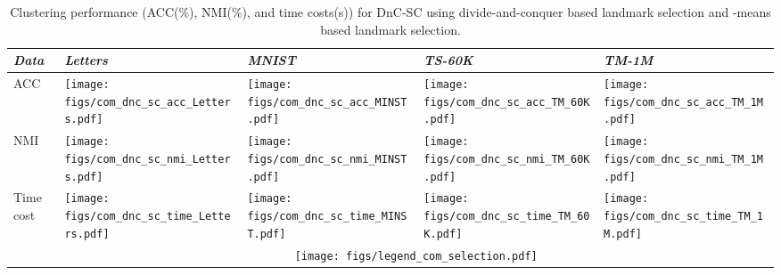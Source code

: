 \begin{table}\centering
  \caption{Clustering performance (ACC(\%), NMI(\%), and time costs(s)) for DnC-SC using divide-and-conquer based landmark selection and -means based landmark selection.}
  \label{table:compare_sel_strategies}
  \begin{threeparttable}
    \begin{tabular}{m{0.75cm}<{\centering}|m{1.45cm}<{\centering}m{1.45cm}<{\centering}m{1.45cm}<{\centering}m{1.45cm}<{\centering}}
      \toprule
      \emph{Data} & \emph{Letters} & \emph{MNIST} & \emph{TS-60K} & \emph{TM-1M} \\
      \midrule
      \multirow{1}{*}{ACC}
      &\texttt{[image: figs/com\_dnc\_sc\_acc\_Letters.pdf]}
      &\texttt{[image: figs/com\_dnc\_sc\_acc\_MINST.pdf]}
      &\texttt{[image: figs/com\_dnc\_sc\_acc\_TM\_60K.pdf]}
      &\texttt{[image: figs/com\_dnc\_sc\_acc\_TM\_1M.pdf]}\\
      NMI
      &\texttt{[image: figs/com\_dnc\_sc\_nmi\_Letters.pdf]}
      &\texttt{[image: figs/com\_dnc\_sc\_nmi\_MINST.pdf]}
      &\texttt{[image: figs/com\_dnc\_sc\_nmi\_TM\_60K.pdf]}
      &\texttt{[image: figs/com\_dnc\_sc\_nmi\_TM\_1M.pdf]}\\
      Time cost
      &\texttt{[image: figs/com\_dnc\_sc\_time\_Letters.pdf]}
      &\texttt{[image: figs/com\_dnc\_sc\_time\_MINST.pdf]}
      &\texttt{[image: figs/com\_dnc\_sc\_time\_TM\_60K.pdf]}
      &\texttt{[image: figs/com\_dnc\_sc\_time\_TM\_1M.pdf]}\\
      &\multicolumn{4}{c}{\texttt{[image: figs/legend\_com\_selection.pdf]}}\\
      \bottomrule
    \end{tabular}
  \end{threeparttable}
\end{table}


